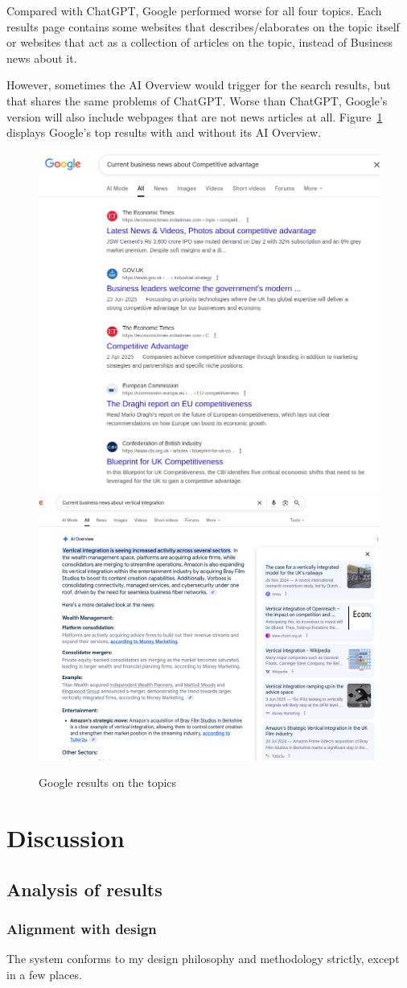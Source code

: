 \documentclass[final-report]{report-template}
\begin{document}
Compared with ChatGPT, Google performed worse for all four topics. Each
results page contains some websites that describes/elaborates on the topic
itself or websites that act as a collection of articles on the topic, instead
of Business news about it. 

However, sometimes the AI Overview would trigger for the search results, but
that shares the same problems of ChatGPT. Worse than ChatGPT, Google's version
will also include webpages that are not news articles at all.
Figure~\ref{fig.results.google} displays Google's top results with and without
its AI Overview.
\begin{figure}[hbtp!]
	\centering
	\includegraphics[width=.3\textwidth]{res/google_res1.png}
	\includegraphics[width=.5\textwidth]{res/google_res2.png}
	\caption{Google results on the topics}
	\label{fig.results.google}
\end{figure}


\section{Discussion}
\subsection{Analysis of results}
\subsubsection{Alignment with design}
The system conforms to my design philosophy and methodology strictly, except
in a few places. 
\end{document}
